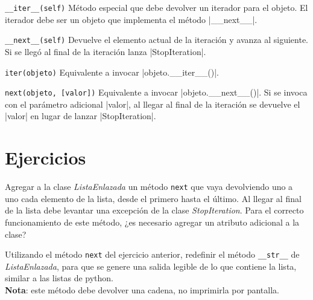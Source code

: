\begin{referencia_python}

\begin{sintaxis}{\lstinline{__iter__(self)}}
Método especial que debe devolver un iterador para el objeto. El iterador debe
ser un objeto que implementa el método |__next__|.
\end{sintaxis}

\begin{sintaxis}{\lstinline{__next__(self)}}
Devuelve el elemento actual de la iteración y avanza al siguiente.
Si se llegó al final de la iteración lanza |StopIteration|.
\end{sintaxis}

\begin{sintaxis}{\lstinline{iter(objeto)}}
Equivalente a invocar |objeto.__iter__()|.
\end{sintaxis}

\begin{sintaxis}{\lstinline{next(objeto, [valor])}}
Equivalente a invocar |objeto.__next__()|. Si se invoca con el parámetro
adicional |valor|, al llegar al final de la iteración se devuelve el |valor| en
lugar de lanzar |StopIteration|.
\end{sintaxis}
\end{referencia_python}

\newpage
\section{Ejercicios}

\begin{ejercicio}
Agregar a la clase {\it ListaEnlazada} un método \verb!next! que vaya
devolviendo uno a uno cada elemento de la lista, desde el primero hasta el
último.  Al llegar al final de la lista debe levantar una excepción de la
clase {\it StopIteration}.  Para el correcto funcionamiento de este método, ¿es
necesario agregar un atributo adicional a la clase?
\end{ejercicio}

\begin{ejercicio}
Utilizando el método \verb!next! del ejercicio anterior, redefinir el
método \verb!__str__! de {\it ListaEnlazada}, para que se genere una salida
legible de lo que contiene la lista, similar a las listas de python. \\
{\bf Nota}: este método debe devolver una cadena, no imprimirla por
pantalla.
\end{ejercicio}

